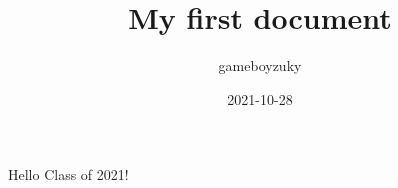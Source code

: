 \documentclass{article}
\title{My first document}
\date{2021-10-28}
\author{gameboyzuky}
\begin{document}
	\maketitle
	\newpage\textit{\textit{}}
	Hello Class of 2021!
\end{document}
